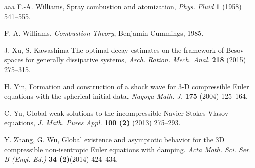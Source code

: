 \documentclass[reqno,11pt]{amsart}
\theoremstyle{plain}
\numberwithin{equation}{section}
\begin{document}
\begin{thebibliography}{aaa}
 F.-A. Williams, Spray combustion and atomization, {\it Phys. Fluid} {\bf 1} (1958) 541--555.

 F.-A. Williams, {\it Combustion Theory}, Benjamin Cummings, 1985.




 J. Xu, S. Kawashima The optimal decay estimates on the
framework of Besov spaces for generally dissipative systems, 
{\it Arch. Ration. Mech. Anal.} {\bf 218} (2015) 275--315. 

H.  Yin,   Formation and construction of a shock wave for 3-D 
 compressible Euler equations with the spherical initial data. 
 \textit{Nagoya Math. J.} \textbf{175} (2004)  125--164.  

 C. Yu,
Global weak solutions to the incompressible Navier-Stokes-Vlasov equations,
{\it J. Math. Pures Appl.} {\bf 100 (2)} (2013) 275--293.

 Y.  Zhang, G. Wu,   Global existence and 
asymptotic behavior for the 3D compressible non-isentropic Euler equations with damping. 
\textit{Acta Math. Sci. Ser. B (Engl. Ed.)} \textbf{34 (2)}(2014)    424--434.  
 

\end{thebibliography}
\end{document}
